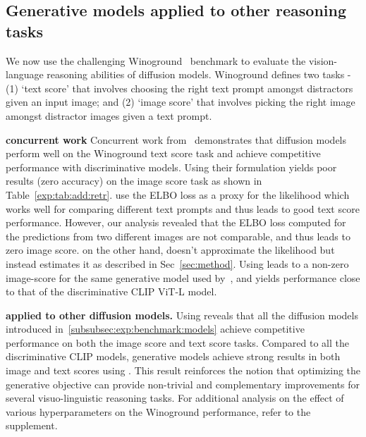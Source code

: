         







\subsection{Generative models applied to other reasoning tasks}\label{subsubsec:exp:abl:retrieval}

We now use the challenging Winoground~\cite{Thrush2022WinogroundPV} benchmark to evaluate the vision-language reasoning abilities of diffusion models.
Winoground defines two tasks - (1) `text score' that involves choosing the right text prompt amongst distractors given an input image; and (2) `image score' that involves picking the right image amongst distractor images given a text prompt.

\par \noindent \textbf{\OURS \vs concurrent work}
Concurrent work from~\cite{li2023diffusion} demonstrates that diffusion models perform well on the Winoground text score task and achieve competitive performance with discriminative models.
Using their formulation yields poor results (zero accuracy) on the image score task as shown in Table~\ref{exp:tab:add:retr}.
\cite{li2023diffusion} use the ELBO loss as a proxy for the likelihood  which works well for comparing different text prompts and thus leads to good text score performance.
However, our analysis revealed that the ELBO loss computed for the predictions from two different images are not comparable, and thus leads to zero image score.
\OURS on the other hand, doesn't approximate the likelihood but instead estimates it as described in Sec~\ref{sec:method}.
Using \OURS leads to a non-zero image-score for the same generative model used by~\cite{li2023diffusion}, and yields performance close to that of the discriminative CLIP ViT-L model.

\par \noindent \textbf{\OURS applied to other diffusion models.}
Using \OURS reveals that all the diffusion models introduced in~\cref{subsubsec:exp:benchmark:models} achieve competitive performance on both the image score and text score tasks.
Compared to all the discriminative CLIP models, generative models achieve strong results in both image and text scores using \OURS.
This result reinforces the notion that optimizing the generative objective can provide non-trivial and complementary improvements for several visuo-linguistic reasoning tasks.
 For additional analysis on the effect of various hyperparameters on the Winoground performance, refer to the supplement.

